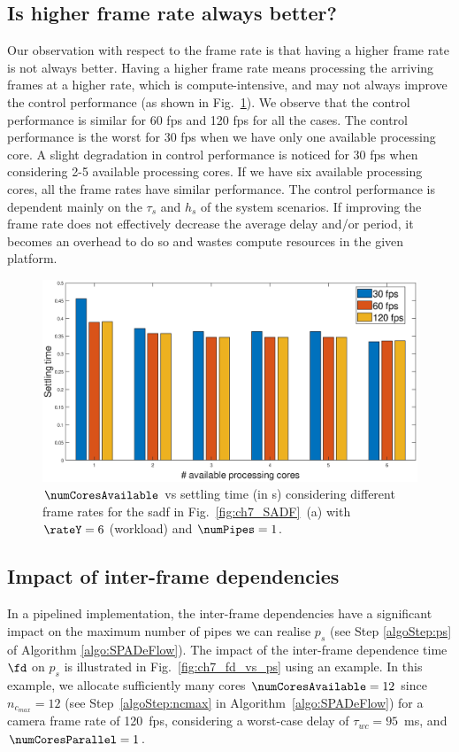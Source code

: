 \subsection{Is higher frame rate always better?}
Our observation with respect to the frame rate is that having a higher frame rate is not always better. 
Having a higher frame rate means processing the arriving frames at a higher rate, which is compute-intensive, and may not always improve the control performance (as shown in Fig.~\ref{fig:ch7_coresVSfhNP}). 
We observe that the control performance is similar for 60 fps and 120 fps for all the cases.
The control performance is the worst for 30 fps when we have only one available processing core.
A slight degradation in control performance is noticed for 30 fps when considering 2-5 available processing cores. 
If we have six available processing cores, all the frame rates have similar performance.
The control performance is dependent mainly on the $\tau_s$ and $h_s$ of the system scenarios.
If improving the frame rate does not effectively decrease the average delay and/or period, it becomes an overhead to do so and wastes compute resources in the given platform.

\begin{figure}[ht]
  \centering
  \includegraphics[width=0.8\linewidth]{images/coresVSfh.eps}   
  \caption{$\numCoresAvailable$ vs settling time (in s) considering different frame rates for the \gls{sadf} in Fig.~\ref{fig:ch7_SADF}~(a) with $\rateY=6$ (workload) and $\numPipes=1$.}
  \label{fig:ch7_coresVSfhNP}
  \vspace{-2em}
\end{figure}

\subsection{Impact of inter-frame dependencies}
In a pipelined implementation, the inter-frame dependencies have a significant impact on the maximum number of pipes we can realise $p_s$ (see Step \ref{algoStep:ps} of Algorithm \ref{algo:SPADeFlow}).
The impact of the inter-frame dependence time $\fd$ on $p_s$ is illustrated in Fig.~\ref{fig:ch7_fd_vs_ps} using an example. 
In this example, we allocate sufficiently many cores $\numCoresAvailable=12$ since $n_{c_{max}}=12$ (see Step~\ref{algoStep:ncmax} in Algorithm~\ref{algo:SPADeFlow}) for a camera frame rate of 120~fps, considering a worst-case delay of $\tau_{wc}=95$~ms, and $\numCoresParallel=1$. 

